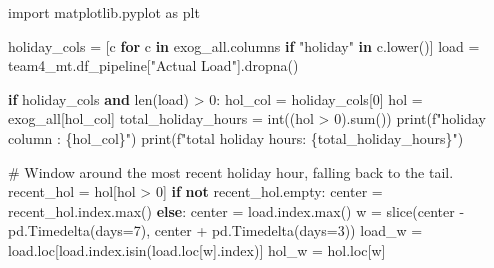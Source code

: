 \documentclass[
  english,
  letterpaper,
]{scrbook}
\newenvironment{Shaded}{\begin{snugshade}}{\end{snugshade}}
\newcommand{\BuiltInTok}[1]{\textcolor[rgb]{0.00,0.23,0.31}{#1}}
\newcommand{\CommentTok}[1]{\textcolor[rgb]{0.37,0.37,0.37}{#1}}
\newcommand{\ControlFlowTok}[1]{\textcolor[rgb]{0.00,0.23,0.31}{\textbf{#1}}}
\newcommand{\DecValTok}[1]{\textcolor[rgb]{0.68,0.00,0.00}{#1}}
\newcommand{\ImportTok}[1]{\textcolor[rgb]{0.00,0.46,0.62}{#1}}
\newcommand{\KeywordTok}[1]{\textcolor[rgb]{0.00,0.23,0.31}{\textbf{#1}}}
\newcommand{\NormalTok}[1]{\textcolor[rgb]{0.00,0.23,0.31}{#1}}
\newcommand{\OperatorTok}[1]{\textcolor[rgb]{0.37,0.37,0.37}{#1}}
\newcommand{\SpecialCharTok}[1]{\textcolor[rgb]{0.37,0.37,0.37}{#1}}
\newcommand{\SpecialStringTok}[1]{\textcolor[rgb]{0.13,0.47,0.30}{#1}}
\newcommand{\StringTok}[1]{\textcolor[rgb]{0.13,0.47,0.30}{#1}}
\begin{document}
\begin{Shaded}
\begin{Highlighting}[]
\ImportTok{import}\NormalTok{ matplotlib.pyplot }\ImportTok{as}\NormalTok{ plt}

\NormalTok{holiday\_cols }\OperatorTok{=}\NormalTok{ [c }\ControlFlowTok{for}\NormalTok{ c }\KeywordTok{in}\NormalTok{ exog\_all.columns }\ControlFlowTok{if} \StringTok{"holiday"} \KeywordTok{in}\NormalTok{ c.lower()]}
\NormalTok{load }\OperatorTok{=}\NormalTok{ team4\_mt.df\_pipeline[}\StringTok{"Actual Load"}\NormalTok{].dropna()}

\ControlFlowTok{if}\NormalTok{ holiday\_cols }\KeywordTok{and} \BuiltInTok{len}\NormalTok{(load) }\OperatorTok{\textgreater{}} \DecValTok{0}\NormalTok{:}
\NormalTok{    hol\_col }\OperatorTok{=}\NormalTok{ holiday\_cols[}\DecValTok{0}\NormalTok{]}
\NormalTok{    hol }\OperatorTok{=}\NormalTok{ exog\_all[hol\_col]}
\NormalTok{    total\_holiday\_hours }\OperatorTok{=} \BuiltInTok{int}\NormalTok{((hol }\OperatorTok{\textgreater{}} \DecValTok{0}\NormalTok{).}\BuiltInTok{sum}\NormalTok{())}
    \BuiltInTok{print}\NormalTok{(}\SpecialStringTok{f"holiday column     : }\SpecialCharTok{\{}\NormalTok{hol\_col}\SpecialCharTok{\}}\SpecialStringTok{"}\NormalTok{)}
    \BuiltInTok{print}\NormalTok{(}\SpecialStringTok{f"total holiday hours: }\SpecialCharTok{\{}\NormalTok{total\_holiday\_hours}\SpecialCharTok{\}}\SpecialStringTok{"}\NormalTok{)}

    \CommentTok{\# Window around the most recent holiday hour, falling back to the tail.}
\NormalTok{    recent\_hol }\OperatorTok{=}\NormalTok{ hol[hol }\OperatorTok{\textgreater{}} \DecValTok{0}\NormalTok{]}
    \ControlFlowTok{if} \KeywordTok{not}\NormalTok{ recent\_hol.empty:}
\NormalTok{        center }\OperatorTok{=}\NormalTok{ recent\_hol.index.}\BuiltInTok{max}\NormalTok{()}
    \ControlFlowTok{else}\NormalTok{:}
\NormalTok{        center }\OperatorTok{=}\NormalTok{ load.index.}\BuiltInTok{max}\NormalTok{()}
\NormalTok{    w }\OperatorTok{=} \BuiltInTok{slice}\NormalTok{(center }\OperatorTok{{-}}\NormalTok{ pd.Timedelta(days}\OperatorTok{=}\DecValTok{7}\NormalTok{), center }\OperatorTok{+}\NormalTok{ pd.Timedelta(days}\OperatorTok{=}\DecValTok{3}\NormalTok{))}
\NormalTok{    load\_w }\OperatorTok{=}\NormalTok{ load.loc[load.index.isin(load.loc[w].index)]}
\NormalTok{    hol\_w }\OperatorTok{=}\NormalTok{ hol.loc[w]}


\end{Highlighting}
\end{Shaded}
\end{document}
